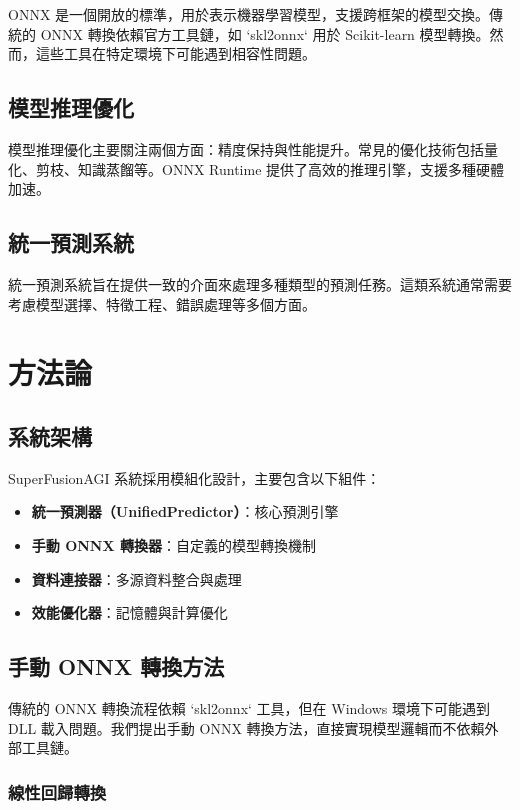 \documentclass[11pt,a4paper]{article}
\begin{document}
ONNX 是一個開放的標準，用於表示機器學習模型，支援跨框架的模型交換。傳統的 ONNX 轉換依賴官方工具鏈，如 `skl2onnx` 用於 Scikit-learn 模型轉換。然而，這些工具在特定環境下可能遇到相容性問題。

\subsection{模型推理優化}

模型推理優化主要關注兩個方面：精度保持與性能提升。常見的優化技術包括量化、剪枝、知識蒸餾等。ONNX Runtime 提供了高效的推理引擎，支援多種硬體加速。

\subsection{統一預測系統}

統一預測系統旨在提供一致的介面來處理多種類型的預測任務。這類系統通常需要考慮模型選擇、特徵工程、錯誤處理等多個方面。

\section{方法論}

\subsection{系統架構}

SuperFusionAGI 系統採用模組化設計，主要包含以下組件：

\begin{itemize}
    \item \textbf{統一預測器（UnifiedPredictor）}：核心預測引擎
    \item \textbf{手動 ONNX 轉換器}：自定義的模型轉換機制
    \item \textbf{資料連接器}：多源資料整合與處理
    \item \textbf{效能優化器}：記憶體與計算優化
\end{itemize}

\subsection{手動 ONNX 轉換方法}

傳統的 ONNX 轉換流程依賴 `skl2onnx` 工具，但在 Windows 環境下可能遇到 DLL 載入問題。我們提出手動 ONNX 轉換方法，直接實現模型邏輯而不依賴外部工具鏈。

\subsubsection{線性回歸轉換}
\end{document}
